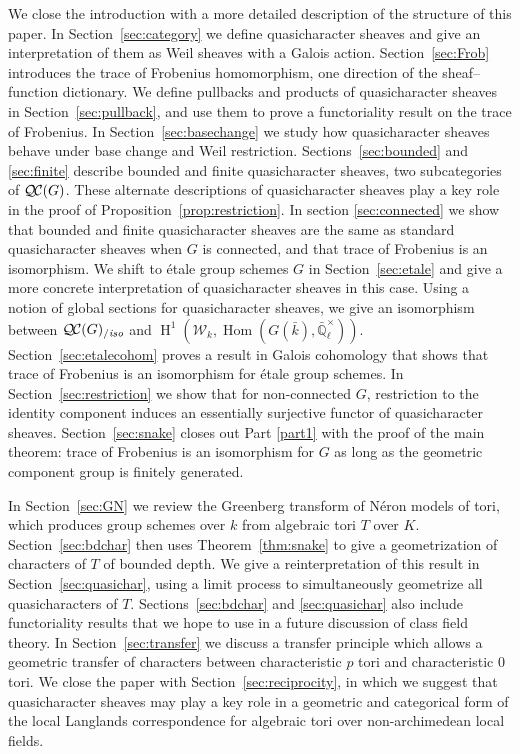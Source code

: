 \documentclass[11pt]{amsart}
\theoremstyle{plain}
\theoremstyle{definition}
\theoremstyle{remark}
\newcommand{\EE}{\mathbb{\bar Q}_\ell}
\newcommand{\bFq}{\bar{k}}
\newcommand{\Fq}{k}
\newcommand{\EEx}{\EE^\times}
\DeclareMathOperator{\Hom}{Hom}
\DeclareMathOperator{\Hh}{H}
\newcommand{\QC}{{\mathcal{Q\hskip-0.8pt C}}}
\newcommand{\QCiso}[1]{\QC(#1)_{/\textit{iso}}}
\newcommand{\Weil}[1]{\mathcal{W}_{#1}}
\begin{document}
We close the introduction with a more detailed description of the structure of this paper.
In Section~\ref{sec:category} we define quasicharacter sheaves and give an interpretation of
them as Weil sheaves with a Galois action.
Section~\ref{sec:Frob} introduces the trace of Frobenius homomorphism,
one direction of the sheaf--function dictionary.
We define pullbacks and products of quasicharacter sheaves in Section~\ref{sec:pullback}, and use
them to prove a functoriality result on the trace of Frobenius.
In Section~\ref{sec:basechange} we study how quasicharacter sheaves behave under base change
and Weil restriction.
Sections~\ref{sec:bounded} and \ref{sec:finite} describe bounded and finite quasicharacter sheaves,
two subcategories of $\QC(G)$.  These alternate descriptions of quasicharacter sheaves play a key
role in the proof of Proposition~\ref{prop:restriction}.
In section \ref{sec:connected} we show that bounded and finite quasicharacter sheaves are the same
as standard quasicharacter sheaves when $G$ is connected, and that trace of Frobenius is an isomorphism.
We shift to \'etale group schemes $G$ in Section~\ref{sec:etale} and give a more concrete interpretation
of quasicharacter sheaves in this case.  Using a notion of global sections for quasicharacter sheaves,
we give an isomorphism between $\QCiso{G}$ and $\Hh^1(\Weil{\Fq}, \Hom(G(\bFq), \EEx))$.
Section~\ref{sec:etalecohom} proves a result in Galois cohomology that shows that trace of Frobenius is
an isomorphism for \'etale group schemes.
In Section~\ref{sec:restriction} we show that for non-connected $G$, restriction to the identity component
induces an essentially surjective functor of quasicharacter sheaves.
Section~\ref{sec:snake} closes out Part \ref{part1} with the proof of the main theorem: trace of Frobenius
is an isomorphism for $G$ as long as the geometric component group is finitely generated.

In Section~\ref{sec:GN} we review the Greenberg transform of N\'eron models of tori, which produces
group schemes over $\Fq$ from algebraic tori $T$ over $K$.
Section~\ref{sec:bdchar} then uses Theorem~\ref{thm:snake} to give a geometrization of characters of $T$
of bounded depth.
We give a reinterpretation of this result in Section~\ref{sec:quasichar}, using a limit process to simultaneously
geometrize all quasicharacters of $T$.  Sections~\ref{sec:bdchar} and \ref{sec:quasichar} also include
functoriality results that we hope to use in a future discussion of class field theory.
In Section~\ref{sec:transfer} we discuss a transfer principle which allows
a geometric transfer of characters between characteristic $p$ tori and characteristic $0$ tori.
We close the paper with Section~\ref{sec:reciprocity}, in which we suggest that quasicharacter sheaves may play a key role in a geometric and categorical form of the local Langlands correspondence for algebraic tori over non-archimedean local fields.
\end{document}
